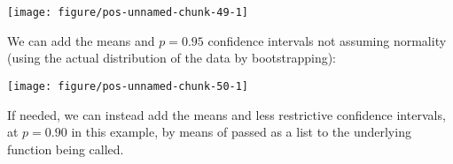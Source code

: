 \documentclass[paper=a4,headsepline,BCOR=12mm,twoside,open=right,%
titlepage,headings=small,fontsize=10pt,index=totoc,bibliography=totoc,%
captions=tableheading,captions=nooneline]{scrbook}\usepackage{knitr}
\begin{document}
\begin{knitrout}\footnotesize
{}\color{fgcolor}\begin{kframe}
\begin{alltt}
 \hlopt{+} \hlstd{(} \hlstd{=} \hlstd{,}
                    \hlstd{=}\hlstd{,} \hlstd{=}\hlstd{,} \hlstd{=}\hlstd{)}
\end{alltt}
\end{kframe}

{\centering \texttt{[image: figure/pos-unnamed-chunk-49-1]} 

}



\end{knitrout}

We can add the means and $p = 0.95$ confidence intervals not assuming normality (using the actual distribution of the data by bootstrapping):

\begin{knitrout}\footnotesize
{}\color{fgcolor}\begin{kframe}
\begin{alltt}
 \hlopt{+} \hlstd{(} \hlstd{=} \hlstd{,}
                    \hlstd{=}\hlstd{,} \hlstd{=}\hlstd{,} \hlstd{=}\hlstd{)}
\end{alltt}
\end{kframe}

{\centering \texttt{[image: figure/pos-unnamed-chunk-50-1]} 

}



\end{knitrout}

If needed, we can instead add the means and less restrictive confidence intervals, at $p = 0.90$ in this example, by means of  passed as a list to the underlying function being called.
\end{document}
